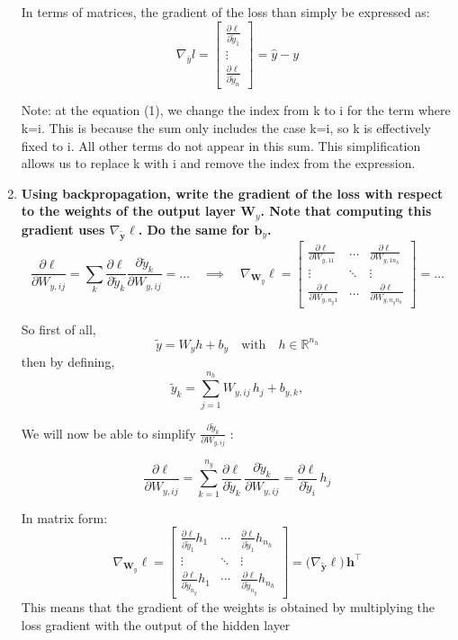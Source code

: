 \documentclass[12pt,a4paper]{article}
\begin{document}
\begin{enumerate}[resume]
    In terms of matrices, the gradient of the loss than simply be expressed as: 
    $$\nabla_{\bar{y}} l =  
    \begin{bmatrix}
    \frac{\partial \ell}{\partial \tilde{y}_1} \\
    \vdots \\
    \frac{\partial \ell}{\partial \tilde{y}_n}
    \end{bmatrix}
    = \hat{y} - y$$

    Note: at the equation (1), we change the index from k to i for the term where k=i. 
    This is because the sum only includes the case k=i, so k is effectively fixed to i. 
    All other terms do not appear in this sum. 
    This simplification allows us to replace k with i and remove the index from the expression.

    \item \textbf{Using backpropagation, write the gradient of the loss with respect to the weights of the output 
    layer $\mathbf{W}_y$. Note that computing this gradient uses $\nabla_{\tilde{\mathbf{y}}} \ell$. Do the same for $\mathbf{b}_y$.} \newline
    \[
    \frac{\partial \ell}{\partial W_{y,ij}} 
    = \sum_k \frac{\partial \ell}{\partial \tilde{y}_k} \frac{\partial \tilde{y}_k}{\partial W_{y,ij}}
    = \dots 
    \quad \implies \quad
    \nabla_{\mathbf{W}_y} \ell =
    \begin{bmatrix}
    \frac{\partial \ell}{\partial W_{y,11}} & \dots & \frac{\partial \ell}{\partial W_{y,1n_h}} \\
    \vdots & \ddots & \vdots \\
    \frac{\partial \ell}{\partial W_{y,n_y1}} & \dots & \frac{\partial \ell}{\partial W_{y,n_y n_h}}
    \end{bmatrix}
    = \dots
    \]

    So first of all,
    \[
    \tilde{y} = W_y h + b_y \quad \text{with} \quad h \in \mathbb{R}^{n_h}
    \]
    then by defining,
    \[
    \tilde{y}_k = \sum_{j=1}^{n_h} W_{y,ij}\,h_j + b_{y,k} ,
    \]

    We will now be able to simplify $ \frac{\partial \tilde{y}_k}{\partial W_{y,ij}} $ :
    
    \[
    \frac{\partial \ell}{\partial W_{y,ij}}
    = \sum_{k=1}^{n_y} \frac{\partial \ell}{\partial \tilde{y}_k}\,\frac{\partial \tilde{y}_k}{\partial W_{y,ij}}
    = \frac{\partial \ell}{\partial \tilde{y}_i}\,h_j 
    \]

    In matrix form:
    \[
    \nabla_{\mathbf{W}_y}\ell =
    \begin{bmatrix}
    \frac{\partial \ell}{\partial \tilde{y}_1} h_1 & \cdots & \frac{\partial \ell}{\partial \tilde{y}_1} h_{n_h}\\
    \vdots & \ddots & \vdots\\
    \frac{\partial \ell}{\partial \tilde{y}_{n_y}} h_1 & \cdots & \frac{\partial \ell}{\partial \tilde{y}_{n_y}} h_{n_h}
    \end{bmatrix}
    = \big(\nabla_{\tilde{\mathbf{y}}}\ell\big)\,\mathbf{h}^{\!\top}
    \]
    This means that the gradient of the weights is obtained by multiplying the loss gradient with the output of the hidden layer


\end{enumerate}
\end{document}
